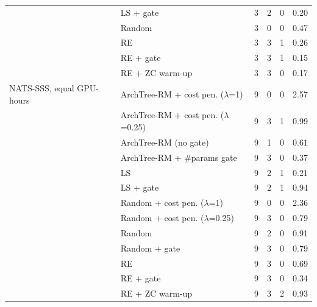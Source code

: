 \begin{tabular}{@{}llrrrr@{}}
 & LS + gate & 3 & 2 & 0 & 0.20\\
 & Random & 3 & 0 & 0 & 0.47\\
 & RE & 3 & 3 & 1 & 0.26\\
 & RE + gate & 3 & 3 & 1 & 0.15\\
 & RE + ZC warm-up & 3 & 3 & 0 & 0.17\\
\midrule
NATS-SSS, equal GPU-hours & ArchTree-RM + cost pen. ($\lambda$=1) & 9 & 0 & 0 & 2.57\\
 & ArchTree-RM + cost pen. ($\lambda$=0.25) & 9 & 3 & 1 & 0.99\\
 & ArchTree-RM (no gate) & 9 & 1 & 0 & 0.61\\
 & ArchTree-RM + \#params gate & 9 & 3 & 0 & 0.37\\
 & LS & 9 & 2 & 1 & 0.21\\
 & LS + gate & 9 & 2 & 1 & 0.94\\
 & Random + cost pen. ($\lambda$=1) & 9 & 0 & 0 & 2.36\\
 & Random + cost pen. ($\lambda$=0.25) & 9 & 3 & 0 & 0.79\\
 & Random & 9 & 2 & 0 & 0.91\\
 & Random + gate & 9 & 3 & 0 & 0.79\\
 & RE & 9 & 3 & 0 & 0.69\\
 & RE + gate & 9 & 3 & 0 & 0.34\\
 & RE + ZC warm-up & 9 & 3 & 2 & 0.93\\
\bottomrule
\end{tabular}
